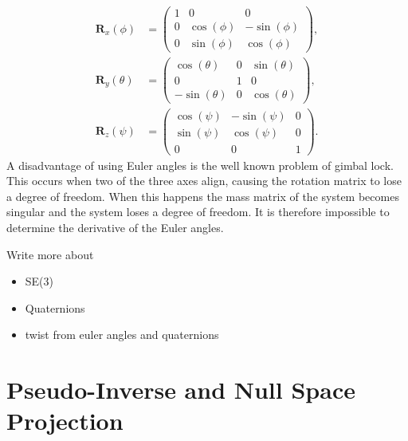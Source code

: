 \begin{subequations}
\begin{align}
    \bm{R}_x(\phi) &= \begin{pmatrix}
        1 & 0 & 0 \\
        0 & \cos(\phi) & -\sin(\phi) \\
        0 & \sin(\phi) & \cos(\phi)
    \end{pmatrix}, \\
    \bm{R}_y(\theta) &= \begin{pmatrix}
        \cos(\theta) & 0 & \sin(\theta) \\
        0 & 1 & 0 \\
        -\sin(\theta) & 0 & \cos(\theta)
    \end{pmatrix}, \\
    \bm{R}_z(\psi) &= \begin{pmatrix}
        \cos(\psi) & -\sin(\psi) & 0 \\
        \sin(\psi) & \cos(\psi) & 0 \\
        0 & 0 & 1
    \end{pmatrix}.
\end{align}
\end{subequations}
A disadvantage of using Euler angles is the well known problem of gimbal lock.
This occurs when two of the three axes align, causing the rotation matrix to lose
a degree of freedom. When this happens the mass matrix of the system becomes singular
and the system loses a degree of freedom. It is therefore impossible to determine
the derivative of the Euler angles.

{\color{red}
Write more about
\begin{itemize}
    \item SE(3)
    \item Quaternions
    \item twist from euler angles and quaternions
\end{itemize}
}

\section{Pseudo-Inverse and Null Space Projection}

